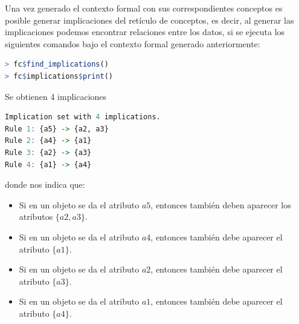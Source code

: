 \documentclass[../../main.tex]{subfiles}
\begin{document}
\vskip 0.2in

Una vez generado el contexto formal con sus correspondientes conceptos es posible generar implicaciones del retículo de conceptos, es decir, al generar las implicaciones podemos encontrar relaciones entre los datos, si se ejecuta los siguientes comandos bajo el contexto formal generado anteriormente:

\vskip 0.2in

\begin{lstlisting}[language=R]
> fc$find_implications()
> fc$implications$print()
\end{lstlisting}

\vskip 0.2in
\newpage
Se obtienen 4 implicaciones

\begin{lstlisting}[language=R]
Implication set with 4 implications.
Rule 1: {a5} -> {a2, a3}
Rule 2: {a4} -> {a1}
Rule 3: {a2} -> {a3}
Rule 4: {a1} -> {a4}
\end{lstlisting}

\vskip 0.2in

donde nos indica que:

\begin{itemize}
    \item Si en un objeto se da el atributo $a5$, entonces también deben aparecer los atributos $\{ a2,a3 \}$.
    \item Si en un objeto se da el atributo $a4$, entonces también debe aparecer el atributo $\{ a1 \}$.
    \item Si en un objeto se da el atributo $a2$, entonces también debe aparecer el atributo $\{ a3 \}$.
    \item Si en un objeto se da el atributo $a1$, entonces también debe aparecer el atributo $\{ a4 \}$.
\end{itemize}
\end{document}
